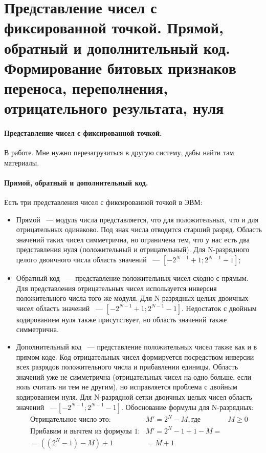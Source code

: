 \documentclass[10pt]{article}
\begin{document}
	\section{Представление чисел с фиксированной точкой. Прямой, обратный и дополнительный код. Формирование битовых признаков переноса, переполнения, отрицательного результата, нуля}
	\paragraph{Представление чисел с фиксированной точкой.}
	В работе. Мне нужно перезагрузиться в другую систему, дабы найти там материалы.
	\paragraph{Прямой, обратный и дополнительный код.}
	Есть три представления чисел с фиксированной точкой в ЭВМ:
	\begin{itemize}
		\item Прямой ~--- модуль числа представляется, что для положительных, что и для отрицательных одинаково. Под знак числа отводится старший разряд. Область значений таких чисел симметрична, но ограничена тем, что у нас есть два представления нуля (положительный и отрицательный). Для N-разрядного целого двоичного числа область значений ~--- $[-2^{N-1} + 1; 2^{N-1} - 1]$;
		\item Обратный код ~--- представление положительных чисел сходно с прямым. Для представления отрицательных чисел используется инверсия положительного числа того же модуля. Для N-разрядных целых двоичных чисел область значений ~--- $[-2^{N-1}+1;2^{N-1}-1]$. Недостаток с двойным кодированием нуля также присутствует, но область значений также симметрична.
		\item Дополнительный код ~--- представление положительных чисел также как и в прямом коде. Код отрицательных чисел формируется посредством инверсии всех разрядов положительного числа и прибавлении единицы. Область значений уже не симметрична (отрицательных чисел на одно больше, если ноль считать ни тем не другим), но исправляется проблема с двойным кодированием нуля. Для N-разрядной сетки двоичных целых чисел область значений ~---$[-2^{N-1};2^{N-1}-1]$. Обоснование формулы для N-разрядных:
		\begin{align*}
			\text{Отрицательное число это:} & M' = 2^N - M,
			\text{где } & M\ge 0\\
			\text{Прибавим и вычтем из формулы 1:} & M' = 2^N - 1 + 1 - M =\\
			= ((2^N - 1) - M) + 1 &= \bar M + 1
		\end{align*}
	\end{itemize}
\end{document}
